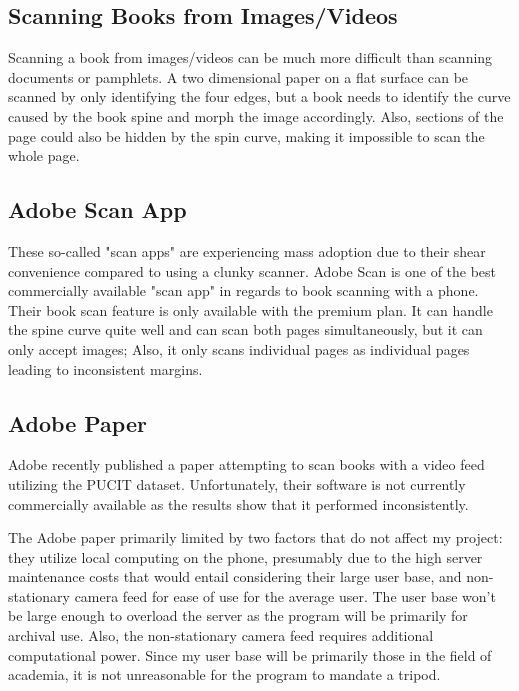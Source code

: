 \documentclass[10pt,twocolumn]{article}
\begin{document}
\subsection{Scanning Books from Images/Videos}

Scanning a book from images/videos can be much more difficult than scanning documents or pamphlets. A two dimensional paper on a flat surface can be scanned by only identifying the four edges, but a book needs to identify the curve caused by the book spine and morph the image accordingly\cite{jiang2015}. Also, sections of the page could also be hidden by the spin curve, making it impossible to scan the whole page\cite{wigington2024}.\newline


\subsection{Adobe Scan App}

These so-called "scan apps" are experiencing mass adoption due to their shear convenience compared to using a clunky scanner\cite{permana2020}. Adobe Scan is one of the best commercially available "scan app" in regards to book scanning with a phone\cite{keough2024}. Their book scan feature is only available with the premium plan. It can handle the spine curve quite well and can scan both pages simultaneously, but it can only accept images; Also, it only scans individual pages as individual pages leading to inconsistent margins.\newline

\subsection{Adobe Paper}

Adobe recently published a paper attempting to scan books with a video feed utilizing the PUCIT dataset\cite{wigington2024}. Unfortunately, their software is not currently commercially available as the results show that it performed inconsistently.\newline

The Adobe paper primarily limited by two factors that do not affect my project: they utilize local computing on the phone, presumably due to the high server maintenance costs that would entail considering their large user base, and non-stationary camera feed for ease of use for the average user. The user base won't be large enough to overload the server as the program will be primarily for archival use. Also, the non-stationary camera feed requires additional computational power. Since my user base will be primarily those in the field of academia, it is not unreasonable for the program to mandate a tripod. \newline
\end{document}
